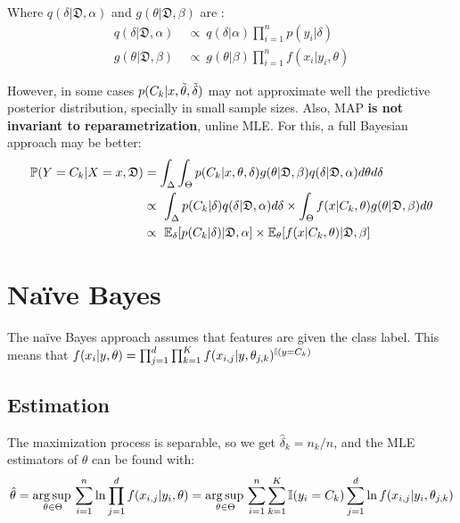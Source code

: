 Where $q(\delta|\mathfrak{D},\alpha)$ and $g(\theta|\mathfrak{D},\beta)$ are :
\begin{align*}
    q(\delta|\mathfrak{D},\alpha)\ & \propto\ q(\delta|\alpha)\prod_{i=1}^n p(y_i|\delta)\\ 
    g(\theta|\mathfrak{D},\beta)\ & \propto\  g(\theta|\beta)\prod_{i=1}^n f(x_i|y_i,\theta)
\end{align*}

However, in some cases $p(C_k|x,\Tilde{\theta},\Tilde{\delta}) $ may not approximate well the predictive posterior distribution, specially in small sample sizes. Also, MAP \textbf{is not invariant to reparametrization}, unline MLE. For this, a full Bayesian approach may be better:
\begin{align*}
    \operatorname{\mathbb{P}}(Y=C_k|X=x,\mathfrak{D}) &=\int_{\Delta}\int_{\Theta}p(C_k|x,\theta,\delta)g(\theta|\mathfrak{D},\beta)q(\delta|\mathfrak{D},\alpha)d\theta d\delta \\
    &\propto\ \int_{\Delta} p(C_k|\delta)q(\delta|\mathfrak{D},\alpha) d\delta\times \int_{\Theta}f(x|C_k,\theta) g(\theta|\mathfrak{D},\beta) d\theta\\
    &\propto\ \operatorname{\mathbb{E}}_{\delta}[p(C_k|\delta)|\mathfrak{D},\alpha]\times \operatorname{\mathbb{E}}_{\theta}[f(x|C_k,\theta)|\mathfrak{D},\beta]
\end{align*}





\section{Naïve Bayes}
The naïve Bayes approach assumes that features are  given the class label. This means that $f(x_i|y,\theta)=\prod_{j=1}^d\prod_{k=1}^K  f(x_{i,j}|y,\theta_{j,k})^{\operatorname{\mathbb{I}}(y=C_k)}$

\subsection{Estimation}

The maximization process is separable, so we get $\hat{\delta}_{k}=n_k/n$, and the MLE estimators of $\theta$ can be found with:
\begin{equation*}
    \hat{\theta}  = \operatorname*{arg\,sup\,}_{\theta\in\Theta} \sum_{i=1}^n\ln\prod_{j=1}^d f(x_{i,j}|y_i,\theta) = \operatorname*{arg\,sup\,}_{\theta\in\Theta} \sum_{i=1}^n\sum_{k=1}^K\operatorname{\mathbb{I}}(y_i=C_k)\sum_{j=1}^d\ln f(x_{i,j}|y_i,\theta_{j,k})
\end{equation*}

